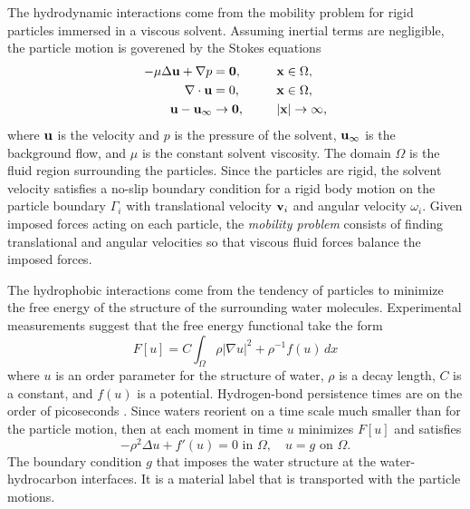 The hydrodynamic interactions come from the mobility problem for rigid
particles immersed in a viscous solvent. Assuming inertial terms are
negligible, the particle motion is goverened by the Stokes equations
\begin{alignat}{3}
\label{eq:stokes1}
  -\mu \Delta \mathbf{u} + \nabla p &= \mathbf{0}, 
    && \mathbf{x} \in \Omega, \\
\label{eq:stokes2}
  \nabla\cdot \mathbf{u} &= 0, \qquad && \mathbf{x} \in \Omega, \\
\label{eq:stokes3}
  \mathbf{u} - \mathbf{u}_\infty &\to \mathbf{0}, && |\mathbf{x}| \to \infty,
\end{alignat}
%
where $\mathbf{u}$ is the velocity and $p$ is the pressure of the solvent,
$\mathbf{u}_\infty$ is the background flow, and $\mu$ is the constant
solvent viscosity. The domain
$\Omega$ is the fluid region surrounding the particles.
Since the particles are rigid, the solvent velocity 
satisfies a no-slip boundary condition for a rigid body motion 
on the particle boundary $\Gamma_i$
with translational velocity $\mathbf{v}_i$ and
angular velocity $\omega_i$.
Given imposed forces acting on each particle,
the \emph{mobility problem} consists of finding
translational and angular velocities so that 
viscous fluid forces balance the imposed forces.

The hydrophobic interactions come from the tendency 
of particles to minimize the free energy of the structure of
the surrounding water molecules.  
Experimental measurements suggest that the free energy functional
take the form 
\begin{equation}
\label{eq:free_energy}
F[u] = C \int_{\Omega}  \rho |\nabla u|^2 + \rho^{-1} f(u) \,dx
\end{equation}
where
$u$ is an order parameter for the structure of water,
$\rho$ is a decay length,
$C$ is a constant, and $f(u)$ is a potential.
Hydrogen-bond persistence times are on the order of picoseconds \cite{MaGa13}.
Since waters reorient 
on a time scale much smaller than for the particle motion, 
then at each moment in time $u$ minimizes $F[u]$ and satisfies 
\begin{equation}
\label{eq:SL}
-\rho^2 \Delta u + f'(u) = 0  \text{ in } \Omega,\quad u = g
\text{ on } \Omega.
\end{equation}
The boundary condition $g$ that imposes 
the water structure at the water-hydrocarbon interfaces.
It is a material label that is transported with the particle motions.


